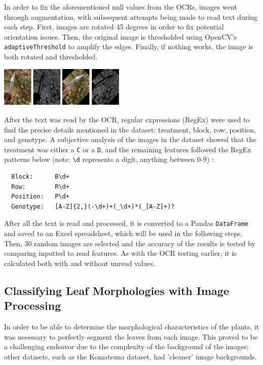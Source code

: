 \documentclass[final,5p,times,twocolumn,authoryear]{elsarticle}
\begin{document}
In order to fix the aforementioned null values from the OCRs, images went through augmentation, with subsequent attempts being made to read text during each step. First, images are rotated 45 degrees in order to fix potential orientation issues. Then, the original image is thresholded using OpenCV's \verb|adaptiveThreshold| to amplify the edges. Finally, if nothing works, the image is both rotated and thresholded.

\begin{center}
    \includegraphics[width=0.45\textwidth]{images/step1_pipeline.png}
\end{center}

After the text was read by the OCR, regular expressions (RegEx) were used to find the precise details mentioned in the dataset: treatment, block, row, position, and genotype. A subjective analysis of the images in the dataset showed that the treatment was either a \verb|C| or a \verb|D|, and the remaining features followed the RegEx patterns below (note: \verb|\d| represents a digit, anything between 0-9) :

\begin{verbatim}
  Block:      B\d+
  Row:        R\d+
  Position:   P\d+
  Genotype:   [A-Z]{2,}(-\d+)+(_\d+)*(_[A-Z]+)?
\end{verbatim}

After all the text is read and processed, it is converted to a Pandas \verb|DataFrame| and saved to an Excel spreadsheet, which will be used in the following steps. Then, 30 random images are selected and the accuracy of the results is tested by comparing inputted to read features. As with the OCR testing earlier, it is calculated both with and without unread values.

\subsection{Classifying Leaf Morphologies with Image Processing}
\label{step_2}

In order to be able to determine the morphological characteristics of the plants, it was necessary to perfectly segment the leaves from each image. This proved to be a challenging endeavor due to the complexity of the background of the images; other datasets, such as the Komatsuna dataset, \citep{uchiyama2017easy} had 'cleaner' image backgrounds.
\end{document}
